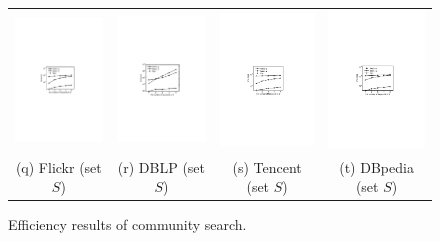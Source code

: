 \begin{figure}[htp]
\begin{tabular}{c c c c}
  \begin{minipage}{3.725cm}
	\includegraphics[width=3.725cm]{figures/flickr-s}
  \end{minipage}
  &
  \begin{minipage}{3.725cm}
	\includegraphics[width=3.725cm]{figures/dblp-s}
  \end{minipage}
  &
  \begin{minipage}{3.725cm}
	\includegraphics[width=3.725cm]{figures/tencent-s}
  \end{minipage}
  &
  \begin{minipage}{3.725cm}
	\includegraphics[width=3.725cm]{figures/dbpedia-s}
  \end{minipage}
  \\
  \small (q) Flickr (set $S$)
  &
  \small (r) DBLP (set $S$)
  &
  \small (s) Tencent (set $S$)
  &
  \small (t) DBpedia (set $S$)
 \end{tabular}
\caption{Efficiency results of community search.}
\label{fig:exp-problem1}
\end{figure}

